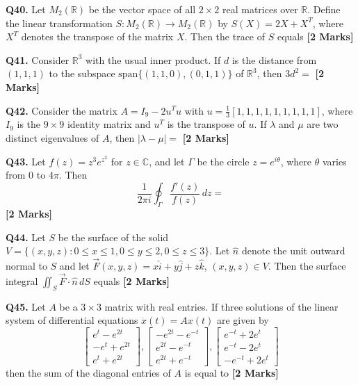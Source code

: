 \documentclass[11pt]{article}
\newcommand{\questionb}[2]{
    \noindent\textbf{Q#2.} #1 \hfill \textbf{[2 Marks]}
}
\begin{document}
\questionb{Let \( M_2(\mathbb{R}) \) be the vector space of all \( 2 \times 2 \) real matrices over \( \mathbb{R} \). Define the linear transformation \( S : M_2(\mathbb{R}) \to M_2(\mathbb{R}) \) by \( S(X) = 2X + X^T \), where \( X^T \) denotes the transpose of the matrix \( X \). Then the trace of \( S \) equals}{40}
\vspace{0.5cm}

\questionb{Consider \( \mathbb{R}^3 \) with the usual inner product. If \( d \) is the distance from \( (1, 1, 1) \) to the subspace \( \text{span}\{(1, 1, 0), (0, 1, 1)\} \) of \( \mathbb{R}^3 \), then \( 3d^2 = \)}{41}
\vspace{0.5cm}

\questionb{Consider the matrix \( A = I_9 - 2u^T u \) with \( u = \frac{1}{3}[1, 1, 1, 1, 1, 1, 1, 1, 1] \), where \( I_9 \) is the \( 9 \times 9 \) identity matrix and \( u^T \) is the transpose of \( u \). If \( \lambda \) and \( \mu \) are two distinct eigenvalues of \( A \), then \( |\lambda - \mu| = \)}{42}
\vspace{0.5cm}

\questionb{Let \( f(z) = z^3 e^{z^2} \) for \( z \in \mathbb{C} \), and let \( \Gamma \) be the circle \( z = e^{i\theta} \), where \( \theta \) varies from 0 to \( 4\pi \). Then \[
\frac{1}{2\pi i} \oint_\Gamma \frac{f'(z)}{f(z)}\, dz = 
\]}{43}
\vspace{0.5cm}

\questionb{Let \( S \) be the surface of the solid \( V = \{(x, y, z) : 0 \le x \le 1, 0 \le y \le 2, 0 \le z \le 3\} \). Let \( \hat{n} \) denote the unit outward normal to \( S \) and let \( \vec{F}(x, y, z) = x\hat{i} + y\hat{j} + z\hat{k} \), \( (x, y, z) \in V \). Then the surface integral \( \iint_S \vec{F} \cdot \hat{n}\, dS \) equals}{44}
\vspace{0.5cm}

\questionb{Let \( A \) be a \( 3 \times 3 \) matrix with real entries. If three solutions of the linear system of differential equations \( \dot{x}(t) = Ax(t) \) are given by
\[
\begin{bmatrix} e^t - e^{2t} \\ -e^t + e^{2t} \\ e^t + e^{2t} \end{bmatrix},
\begin{bmatrix} -e^{2t} - e^{-t} \\ e^{2t} - e^{-t} \\ e^{2t} + e^{-t} \end{bmatrix},
\begin{bmatrix} e^{-t} + 2e^t \\ e^{-t} - 2e^t \\ -e^{-t} + 2e^t \end{bmatrix}
\]
then the sum of the diagonal entries of \( A \) is equal to}{45}
\vspace{0.5cm}
\end{document}
